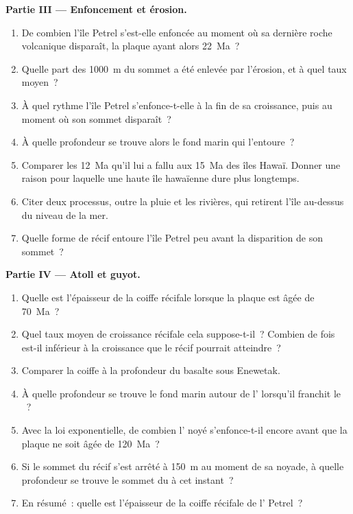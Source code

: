 \begin{problem}
\noindent\textbf{Partie III --- Enfoncement et érosion.}
\begin{enumerate}[resume]
  \item De combien l'île Petrel s'est-elle enfoncée au moment où sa dernière roche volcanique disparaît, la
        plaque ayant alors \qty{22}{Ma}~?
  \item Quelle part des \qty{1000}{m} du sommet a été enlevée par l'érosion, et à quel taux moyen~?
  \item À quel rythme l'île Petrel s'enfonce-t-elle à la fin de sa croissance, puis au moment où son sommet disparaît~?
  \item À quelle profondeur se trouve alors le fond marin qui l'entoure~?
  \item Comparer les \qty{12}{Ma} qu'il lui a fallu aux \qty{15}{Ma} des îles Hawaï. Donner une
        raison pour laquelle une haute île hawaïenne dure plus longtemps.
  \item Citer deux processus, outre la pluie et les rivières, qui retirent l'île au-dessus du niveau de la mer.
  \item Quelle forme de récif entoure l'île Petrel peu avant la disparition de son sommet~?
\end{enumerate}

\noindent\textbf{Partie IV --- Atoll et guyot.}
\begin{enumerate}[resume]
  \item Quelle est l'épaisseur de la coiffe récifale lorsque la plaque est âgée de \qty{70}{Ma}~?
  \item Quel taux moyen de croissance récifale cela suppose-t-il~? Combien de fois est-il inférieur à la croissance
        que le récif pourrait atteindre~?
  \item Comparer la coiffe à la profondeur du basalte sous Enewetak.
  \item À quelle profondeur se trouve le fond marin autour de l' lorsqu'il franchit le ~?
  \item Avec la loi exponentielle, de combien l' noyé s'enfonce-t-il encore avant que la plaque ne soit
        âgée de \qty{120}{Ma}~?
  \item Si le sommet du récif s'est arrêté à \qty{150}{m} au moment de sa noyade, à quelle profondeur se trouve le sommet du
         à cet instant~?
  \item En résumé~: quelle est l'épaisseur de la coiffe récifale de l' Petrel~?
\end{enumerate}
\end{problem}
